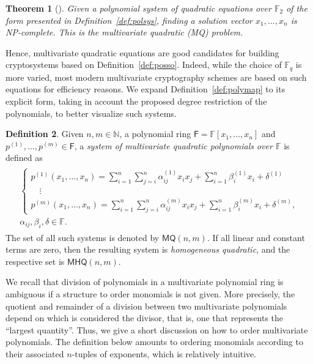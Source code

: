 \documentclass[draft, 12pt, a4paper, oneside]{memoir}
\newtheorem{theorem}{Theorem}[section]
\theoremstyle{definition}
\newtheorem{definition}[theorem]{Definition}
\begin{document}
\begin{theorem}[{\cite[Appendix A]{Patarin:199711}}]
  Given a polynomial system of \emph{quadratic equations over $\mathbb{F}_{2}$} of the form presented in Definition~\ref{def:polsys}, finding a solution vector $x_{1}, \dots, x_{n}$ is NP-complete. This is the \emph{multivariate quadratic (MQ) problem}.
\end{theorem}

Hence, multivariate quadratic equations are good candidates for building cryptosystems based on Definition~\ref{def:posso}. Indeed, while the choice of $\mathbb{F}_{q}$ is more varied, most modern multivariate cryptography schemes are based on such equations for efficiency reasons. We expand Definition~\ref{def:polymap} to its explicit form, taking in account the proposed degree restriction of the polynomials, to better visualize such systems.

\begin{definition}\label{def:quadsys}
  Given $n, m \in \mathbb{N}$, a polynomial ring $\mathsf{F} = \mathbb{F}[x_{1}, \dots, x_{n}]$ and $p^{(1)}, \dots, p^{(m)} \in \mathsf{F}$, a \emph{system of multivariate quadratic polynomials over $\mathbb{F}$} is defined as
  \begin{align}
    \begin{split}
      \begin{cases}
        p^{(1)}(x_{1}, \dots, x_{n}) = 
          \sum_{i = 1}^{n} \sum_{j = i}^{n} \alpha_{ij}^{(1)} x_{i} x_{j}
            + \sum_{i = 1}^{n} \beta_{i}^{(1)} x_{i} + \delta^{(1)} \\
        \quad \vdots \\
        p^{(m)}(x_{1}, \dots, x_{n}) = 
          \sum_{i = 1}^{n} \sum_{j = i}^{n} \alpha_{ij}^{(m)} x_{i} x_{j}
            + \sum_{i = 1}^{n} \beta_{i}^{(m)} x_{i} + \delta^{(m)},
      \end{cases} \\
      \alpha_{ij}, \beta_{i}, \delta \in \mathbb{F}.
    \end{split}
  \end{align}
  The set of all such systems is denoted by $\mathsf{MQ}(n, m)$. If all linear and constant terms are zero, then the resulting system is \emph{homogeneous quadratic}, and the respective set is $\mathsf{MHQ}(n, m)$.
\end{definition}

We recall that division of polynomials in a multivariate polynomial ring is ambiguous if a structure to order monomials is not given. More precisely, the quotient and remainder of a division between two multivariate polynomials depend on which is considered the divisor, that is, one that represents the ``largest quantity''. Thus, we give a short discussion on how to order multivariate polynomials. The definition below amounts to ordering monomials according to their associated $n$-tuples of exponents, which is relatively intuitive. 
\end{document}
